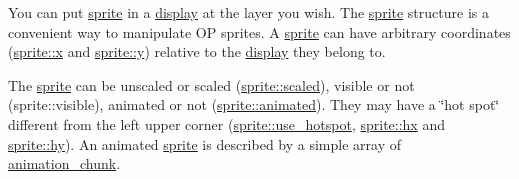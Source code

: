 You can put \hyperlink{structsprite}{sprite} in a \hyperlink{structdisplay}{display} at the layer you wish. The \hyperlink{structsprite}{sprite} structure is a convenient way to manipulate OP sprites. A \hyperlink{structsprite}{sprite} can have arbitrary coordinates (\hyperlink{structsprite_5b48711690e0d8fd0b25a82a18756816}{sprite::x} and \hyperlink{structsprite_a8dc6f3d689443af5ec63fd4d90ed519}{sprite::y}) relative to the \hyperlink{structdisplay}{display} they belong to.

The \hyperlink{structsprite}{sprite} can be unscaled or scaled (\hyperlink{structsprite_a394695544784a6b64e10a5048593387}{sprite::scaled}), visible or not (sprite::visible), animated or not (\hyperlink{structsprite_daf6656b292f5f6236c8dd3ea4457735}{sprite::animated}). They may have a \char`\"{}hot spot\char`\"{} different from the left upper corner (\hyperlink{structsprite_abf5eff390d7222c61b15811512088d9}{sprite::use\_\-hotspot}, \hyperlink{structsprite_2b3011ec3ce10cc3211fb7bdc17d3e8b}{sprite::hx} and \hyperlink{structsprite_3aef5a02d3b7ac32229ae776b468b278}{sprite::hy}). An animated \hyperlink{structsprite}{sprite} is described by a simple array of \hyperlink{structanimation__chunk}{animation\_\-chunk}.

